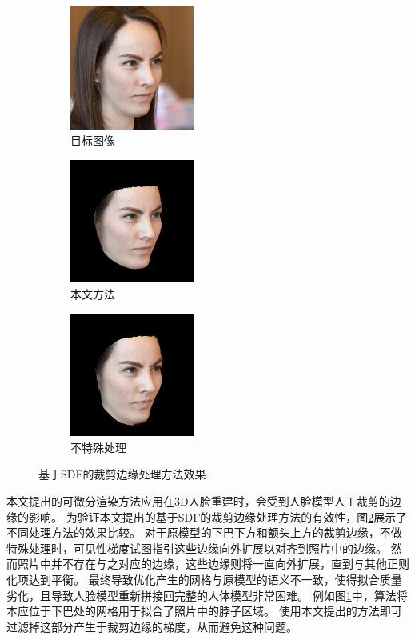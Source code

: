 \begin{figure}
    \centering
    \begin{subfigure}{1.6in}
        \includegraphics[height=1.6in]{figures/diffrast_face/04114/target_hs}%
        \caption{目标图像}
    \end{subfigure}%
    \begin{subfigure}{1.6in}
        \includegraphics[height=1.6in]{figures/diffrast_face/04114/final_rerendered}%
        \caption{本文方法}
    \end{subfigure}%
    \begin{subfigure}{1.6in}
        \includegraphics[height=1.6in]{figures/diffrast_face/04114/no_sdf}%
        \caption{不特殊处理}
        \label{fig:edge_gradient_no_sdf}
\end{subfigure}%
    \caption{基于SDF的裁剪边缘处理方法效果}
    \label{fig:edge_gradient}
\end{figure}
本文提出的可微分渲染方法应用在3D人脸重建时，会受到人脸模型人工裁剪的边缘的影响。
为验证本文提出的基于SDF的裁剪边缘处理方法的有效性，图\ref{fig:edge_gradient}展示了不同处理方法的效果比较。
对于原模型的下巴下方和额头上方的裁剪边缘，不做特殊处理时，可见性梯度试图指引这些边缘向外扩展以对齐到照片中的边缘。
然而照片中并不存在与之对应的边缘，这些边缘则将一直向外扩展，直到与其他正则化项达到平衡。
最终导致优化产生的网格与原模型的语义不一致，使得拟合质量劣化，且导致人脸模型重新拼接回完整的人体模型非常困难。
例如图\ref{fig:edge_gradient_no_sdf}中，算法将本应位于下巴处的网格用于拟合了照片中的脖子区域。
使用本文提出的方法即可过滤掉这部分产生于裁剪边缘的梯度，从而避免这种问题。

